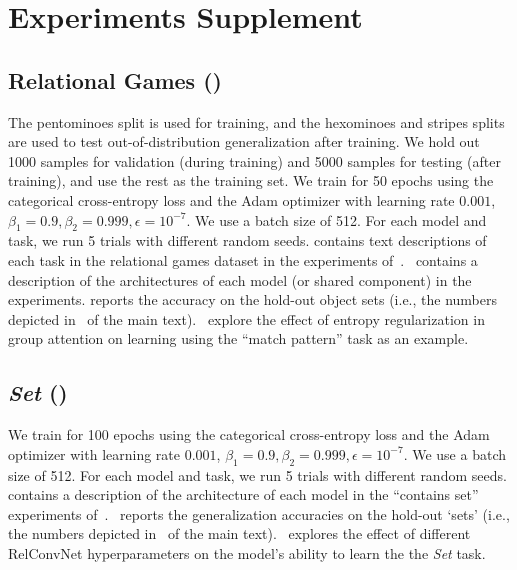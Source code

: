 \section{Experiments Supplement}\label{sec:experiments_supplement}

\subsection{Relational Games ()}

The pentominoes split is used for training, and the hexominoes and stripes splits are used to test out-of-distribution generalization after training. We hold out 1000 samples for validation (during training) and 5000 samples for testing (after training), and use the rest as the training set. We train for 50 epochs using the categorical cross-entropy loss and the Adam optimizer with learning rate $0.001$, $\beta_1 = 0.9, \beta_2 = 0.999, \epsilon = 10^{-7}$. We use a batch size of 512. For each model and task, we run 5 trials with different random seeds. contains text descriptions of each task in the relational games dataset in the experiments of~.~ contains a description of the architectures of each model (or shared component) in the experiments.
 reports the accuracy on the hold-out object sets (i.e., the numbers depicted in~ of the main text).~ explore the effect of entropy regularization in group attention on learning using the ``match pattern'' task as an example.


\subsection{\textit{Set} ()}

We train for 100 epochs using the categorical cross-entropy loss and the Adam optimizer with learning rate $0.001$, $\beta_1 = 0.9, \beta_2 = 0.999, \epsilon = 10^{-7}$. We use a batch size of 512. For each model and task, we run 5 trials with different random seeds. contains a description of the architecture of each model in the ``contains set'' experiments of~.~ reports the generalization accuracies on the hold-out `sets' (i.e., the numbers depicted in~ of the main text).~ explores the effect of different RelConvNet hyperparameters on the model's ability to learn the the \textit{Set} task.

